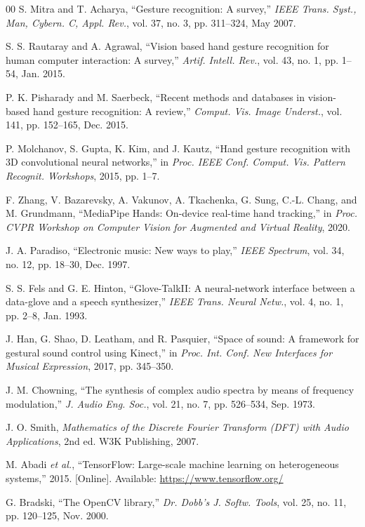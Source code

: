 \documentclass[conference]{IEEEtran}
\begin{document}
\begin{thebibliography}{00}
 S. Mitra and T. Acharya, ``Gesture recognition: A survey,'' \textit{IEEE Trans. Syst., Man, Cybern. C, Appl. Rev.}, vol. 37, no. 3, pp. 311--324, May 2007.

 S. S. Rautaray and A. Agrawal, ``Vision based hand gesture recognition for human computer interaction: A survey,'' \textit{Artif. Intell. Rev.}, vol. 43, no. 1, pp. 1--54, Jan. 2015.

 P. K. Pisharady and M. Saerbeck, ``Recent methods and databases in vision-based hand gesture recognition: A review,'' \textit{Comput. Vis. Image Underst.}, vol. 141, pp. 152--165, Dec. 2015.

 P. Molchanov, S. Gupta, K. Kim, and J. Kautz, ``Hand gesture recognition with 3D convolutional neural networks,'' in \textit{Proc. IEEE Conf. Comput. Vis. Pattern Recognit. Workshops}, 2015, pp. 1--7.

 F. Zhang, V. Bazarevsky, A. Vakunov, A. Tkachenka, G. Sung, C.-L. Chang, and M. Grundmann, ``MediaPipe Hands: On-device real-time hand tracking,'' in \textit{Proc. CVPR Workshop on Computer Vision for Augmented and Virtual Reality}, 2020.

 J. A. Paradiso, ``Electronic music: New ways to play,'' \textit{IEEE Spectrum}, vol. 34, no. 12, pp. 18--30, Dec. 1997.

 S. S. Fels and G. E. Hinton, ``Glove-TalkII: A neural-network interface between a data-glove and a speech synthesizer,'' \textit{IEEE Trans. Neural Netw.}, vol. 4, no. 1, pp. 2--8, Jan. 1993.

 J. Han, G. Shao, D. Leatham, and R. Pasquier, ``Space of sound: A framework for gestural sound control using Kinect,'' in \textit{Proc. Int. Conf. New Interfaces for Musical Expression}, 2017, pp. 345--350.

 J. M. Chowning, ``The synthesis of complex audio spectra by means of frequency modulation,'' \textit{J. Audio Eng. Soc.}, vol. 21, no. 7, pp. 526--534, Sep. 1973.

 J. O. Smith, \textit{Mathematics of the Discrete Fourier Transform (DFT) with Audio Applications}, 2nd ed. W3K Publishing, 2007.

 M. Abadi \textit{et al.}, ``TensorFlow: Large-scale machine learning on heterogeneous systems,'' 2015. [Online]. Available: \url{https://www.tensorflow.org/}

 G. Bradski, ``The OpenCV library,'' \textit{Dr. Dobb's J. Softw. Tools}, vol. 25, no. 11, pp. 120--125, Nov. 2000.
\end{thebibliography}
\end{document}
